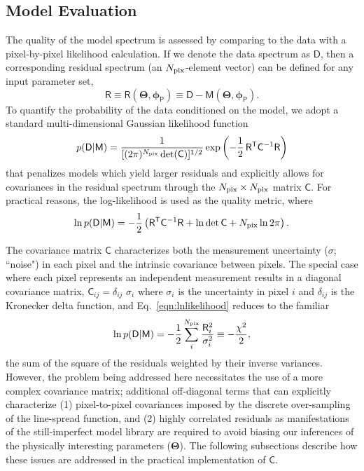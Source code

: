 \documentclass[iop,floatfix]{emulateapj}
\newcommand{\vM}{\mathsf{M}}
\newcommand{\vD}{\mathsf{D}}
\newcommand{\vR}{\mathsf{R}}
\newcommand{\vC}{\mathsf{C}}
\newcommand{\trans}{\mathsf{T}}
\newcommand{\vT}{ {\bm \Theta}}
\newcommand{\vp}{ {\bm \phi}}
\newcommand{\cheb}{ \vp_{\mathsf{P}}}
\begin{document}
\subsection{Model Evaluation} \label{subsec:likelihood}

The quality of the model spectrum is assessed by comparing to the data with a pixel-by-pixel 
likelihood calculation.  If we denote the data spectrum as $\vD$, then a corresponding residual 
spectrum (an $N_{\rm pix}$-element vector) can be defined for any input parameter set,
\begin{equation}
\vR \equiv \vR(\vT, \cheb) \equiv \vD-\vM(\vT, \cheb).
\end{equation}
To quantify the probability of the data conditioned on the model, we adopt a standard 
multi-dimensional Gaussian likelihood function
\begin{equation}
p(\vD|\vM) =  \frac{1}{[(2 \pi)^{N_{\rm pix}} \det(\vC)]^{1/2}} \exp\left ( -\frac{1}{2} \,
   \vR^\trans \vC^{-1} \vR \right )
   \label{eqn:likelihood}
\end{equation}
that penalizes models which yield larger residuals and explicitly allows for covariances in the 
residual spectrum through the $N_{\rm pix} \times N_{\rm pix}$ matrix $\vC$.  For practical 
reasons, the log-likelihood is used as the quality metric, where
\begin{equation}
  \ln{p(\vD | \vM)} = -\frac{1}{2} \left( \vR^\trans \vC^{-1} \vR + \ln{\det{\vC}} + N_{\rm pix} \ln{2\pi} \right).
  \label{eqn:lnlikelihood}
\end{equation}

The covariance matrix $\vC$ characterizes both the measurement uncertainty ($\sigma$; ``noise") in 
each pixel and the intrinsic covariance between pixels.  The special case where each pixel 
represents an independent measurement results in a diagonal covariance matrix, $\vC_{ij} = 
\delta_{ij} \,\, \sigma_i$ where $\sigma_i$ is the uncertainty in pixel $i$ and $\delta_{ij}$ is 
the Kronecker delta function, and Eq.~\ref{eqn:lnlikelihood} reduces to the familiar
\begin{equation}
\ln{p(\vD | \vM)} = -\frac{1}{2} \sum_i^{N_{\rm pix}} \frac{\vR_i^2}{\sigma_i^2} \equiv -\frac{\chi^2}{2},
\label{eqn:chisq}
\end{equation}
the sum of the square of the residuals weighted by their inverse variances.  However, the problem 
being addressed here necessitates the use of a more complex covariance matrix; additional 
off-diagonal terms that can explicitly characterize (1) pixel-to-pixel covariances imposed by the 
discrete over-sampling of the line-spread function, and (2) highly correlated residuals as 
manifestations of the still-imperfect model library are required to avoid biasing our inferences of 
the physically interesting parameters ($\vT$).  The following subsections describe how these issues 
are addressed in the practical implementation of $\vC$.  
\end{document}
